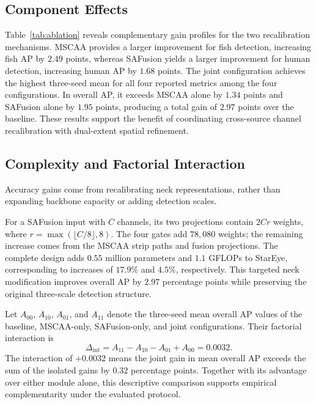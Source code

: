 \documentclass[letterpaper,10pt,conference]{ieeeconf}
\newcommand{\JointInteraction}{\ensuremath{0.0032}}
\begin{document}
\subsection{Component Effects}
Table~\ref{tab:ablation} reveals complementary gain profiles for the two recalibration mechanisms. MSCAA provides a larger improvement for fish detection, increasing fish AP by \(2.49\) points, whereas SAFusion yields a larger improvement for human detection, increasing human AP by \(1.68\) points. The joint configuration achieves the highest three-seed mean for all four reported metrics among the four configurations. In overall AP, it exceeds MSCAA alone by \(1.34\) points and SAFusion alone by \(1.95\) points, producing a total gain of \(2.97\) points over the baseline. These results support the benefit of coordinating cross-source channel recalibration with dual-extent spatial refinement.

\subsection{Complexity and Factorial Interaction}
Accuracy gains come from recalibrating neck representations, rather than expanding backbone capacity or adding detection scales.

For a SAFusion input with \(C\) channels, its two projections contain \(2Cr\)
weights, where \(r=\max(\lfloor C/8\rfloor,8)\). The four gates add \(78{,}080\)
weights; the remaining increase comes from the MSCAA strip paths and fusion
projections. The complete design adds \(0.55\) million parameters and
\(1.1\) GFLOPs to StarEye, corresponding to increases of
\(17.9\%\) and \(4.5\%\), respectively. This targeted neck
modification improves overall AP by \(2.97\) percentage points
while preserving the original three-scale detection structure.

Let \(A_{00}\), \(A_{10}\), \(A_{01}\), and \(A_{11}\) denote the three-seed mean overall AP values of the
baseline, MSCAA-only, SAFusion-only, and joint configurations. Their factorial
interaction is
\begin{equation}
 \Delta_{\mathrm{int}}=A_{11}-A_{10}-A_{01}+A_{00}=\JointInteraction.
 \label{eq:interaction}
\end{equation}
The interaction of \(+0.0032\) means the joint gain in mean overall AP exceeds
the sum of the isolated gains by \(0.32\) percentage points. Together with its
advantage over either module alone, this descriptive comparison supports
empirical complementarity under the evaluated protocol.
\end{document}

